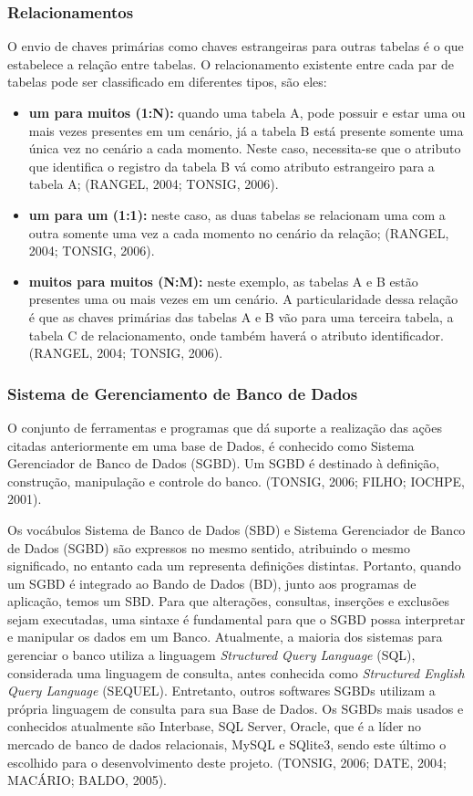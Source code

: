 \documentclass[a4paper,12pt]{article}
\begin{document}
\subsubsection{Relacionamentos}
O envio de chaves primárias como chaves estrangeiras para outras tabelas é o que estabelece a relação entre tabelas. O relacionamento 
existente entre cada par de tabelas pode ser classificado em diferentes tipos, são eles:
\begin{itemize}
	\item\textbf{um para muitos (1:N):} quando uma tabela A, pode possuir e estar uma ou mais vezes presentes em um cenário, já a tabela B está presente somente uma 
	única vez no cenário a cada momento. Neste caso, necessita-se que o atributo que identifica o registro da tabela B vá como atributo estrangeiro para 
	a tabela A; (RANGEL, 2004; TONSIG, 2006).
	\item\textbf{um para um (1:1):} neste caso, as duas tabelas se relacionam uma com a outra somente uma vez a cada momento 
	no cenário da relação; (RANGEL, 2004; TONSIG, 2006).
	\item\textbf{muitos para muitos (N:M):} neste exemplo, as tabelas A e B estão presentes uma ou mais vezes em um cenário. 
	A particularidade dessa relação é que as chaves primárias das tabelas A e B vão para uma terceira tabela, a tabela C de relacionamento, 
	onde também haverá o atributo identificador. (RANGEL, 2004; TONSIG, 2006).
\end{itemize}

\subsubsection{Sistema de Gerenciamento de Banco de Dados}
O conjunto de ferramentas e programas que dá suporte a realização das ações citadas anteriormente em uma base de Dados, é conhecido como 
Sistema Gerenciador de Banco de Dados (SGBD). Um SGBD é destinado à definição, construção, manipulação e controle do banco. (TONSIG, 2006; FILHO; IOCHPE, 2001). 

Os vocábulos Sistema de Banco de Dados (SBD) e Sistema Gerenciador de Banco de Dados (SGBD) são expressos no mesmo sentido, atribuindo o mesmo 
significado, no entanto cada um representa definições distintas. Portanto, quando um SGBD é integrado ao Bando de Dados (BD), junto aos 
programas de aplicação, temos um SBD. Para que alterações, consultas, inserções e exclusões sejam executadas, uma sintaxe é fundamental 
para que o SGBD possa interpretar e manipular os dados em um Banco. Atualmente, a maioria dos sistemas para gerenciar o banco utiliza a 
linguagem \textit{Structured Query Language} (SQL), considerada uma linguagem de consulta, antes conhecida 
como \textit{Structured English Query Language} (SEQUEL). Entretanto, outros softwares SGBDs utilizam a própria linguagem de 
consulta para sua Base de Dados. Os SGBDs mais usados e 
conhecidos atualmente são Interbase, SQL Server, Oracle, que é a líder no mercado de banco de dados relacionais, 
MySQL e SQlite3, sendo este último o escolhido para o desenvolvimento deste projeto. (TONSIG, 2006; DATE, 2004; MACÁRIO; BALDO, 2005). 
\end{document}
